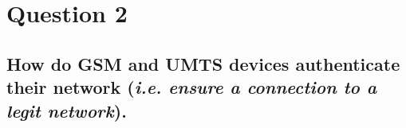 \documentclass{report}
\begin{document}
	\section{Question 2}
	\startsection
		\renewcommand{\thesubsection}{\thesection.\Alph{subsection}}
		\subsection{How do GSM and UMTS devices authenticate their network (\textit{i.e. ensure a connection to a legit network}).}
		\startsubsection
		\closesection
	\closesection
\end{document}
